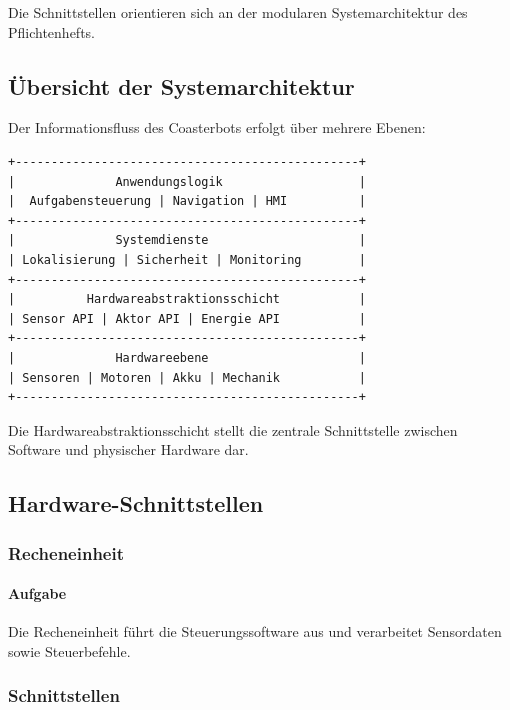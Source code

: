 Die Schnittstellen orientieren sich an der modularen Systemarchitektur
des Pflichtenhefts.

\subsection{Übersicht der
Systemarchitektur}\label{uxfcbersicht-der-systemarchitektur}

Der Informationsfluss des Coasterbots erfolgt über mehrere Ebenen:

\begin{verbatim}
+------------------------------------------------+
|              Anwendungslogik                   |
|  Aufgabensteuerung | Navigation | HMI          |
+------------------------------------------------+
|              Systemdienste                     |
| Lokalisierung | Sicherheit | Monitoring        |
+------------------------------------------------+
|          Hardwareabstraktionsschicht           |
| Sensor API | Aktor API | Energie API           |
+------------------------------------------------+
|              Hardwareebene                     |
| Sensoren | Motoren | Akku | Mechanik           |
+------------------------------------------------+
\end{verbatim}

Die Hardwareabstraktionsschicht stellt die zentrale Schnittstelle
zwischen Software und physischer Hardware dar.

\subsection{Hardware-Schnittstellen}\label{hardware-schnittstellen}

\subsubsection{Recheneinheit}\label{recheneinheit-1}

\paragraph{Aufgabe}\label{aufgabe-12}

Die Recheneinheit führt die Steuerungssoftware aus und verarbeitet
Sensordaten sowie Steuerbefehle.

\subsubsection{Schnittstellen}\label{schnittstellen-1}

